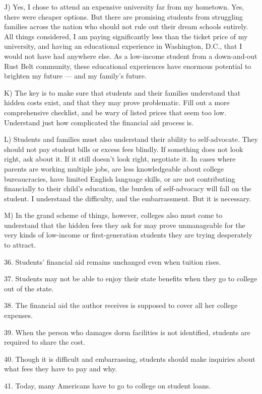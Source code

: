 \documentclass[UTF8,11pt]{ctexart}
\begin{document}
J) Yes, I chose to attend an expensive university far from my hometown. Yes, there were cheaper options. But there are promising students from struggling families across the nation who should not rule out their dream schools entirely. All things considered, I am paying significantly less than the ticket price of my university, and having an educational experience in Washington, D.C., that I would not have had anywhere else. As a low-income student from a down-and-out Rust Belt community, these educational experiences have enormous potential to brighten my future — and my family's future.


K) The key is to make sure that students and their families understand that hidden costs exist, and that they may prove problematic. Fill out a more comprehensive checklist, and be wary of listed prices that seem too low. Understand just how complicated the financial aid process is.


L) Students and families must also understand their ability to self-advocate. They should not pay student bills or excess fees blindly. If something does not look right, ask about it. If it still doesn't look right, negotiate it. In cases where parents are working multiple jobs, are less knowledgeable about college bureaucracies, have limited English language skills, or are not contributing financially to their child's education, the burden of self-advocacy will fall on the student. I understand the difficulty, and the embarrassment. But it is necessary.


M) In the grand scheme of things, however, colleges also must come to understand that the hidden fees they ask for may prove unmanageable for the very kinds of low-income or first-generation students they are trying desperately to attract.


36. Students' financial aid remains unchanged even when tuition rises.


37. Students may not be able to enjoy their state benefits when they go to college out of the state.


38. The financial aid the author receives is supposed to cover all her college expenses.


39. When the person who damages dorm facilities is not identified, students are required to share the cost.


40. Though it is difficult and embarrassing, students should make inquiries about what fees they have to pay and why.


41. Today, many Americans have to go to college on student loans.
\end{document}

